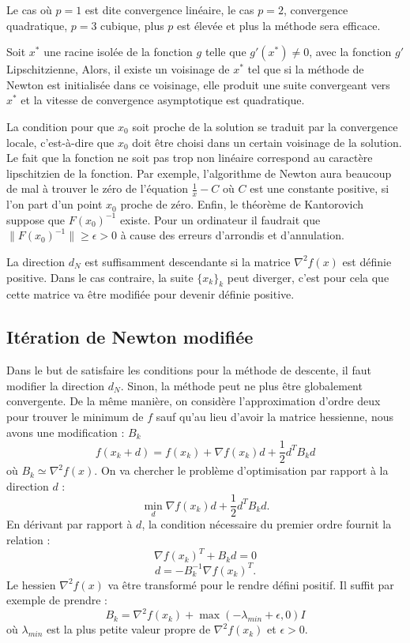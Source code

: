 Le cas o\`u $p=1$ est dite convergence lin\'eaire, le cas $p=2$, convergence quadratique, $p=3$ cubique, plus $p$
est \'elev\'ee et plus la m\'ethode sera efficace.

\begin{frtheoreme}
Soit $x^*$ une racine isol\'ee de la fonction $g$ telle que $g'(x^*)\neq 0$, avec la fonction $g'$ Lipschitzienne, 
 Alors, il existe un voisinage de $x^*$ tel que si la m\'ethode de Newton 
est initialis\'ee dans ce voisinage, elle produit une suite convergeant vers $x^*$ et la vitesse de convergence 
asymptotique est quadratique.
\end{frtheoreme}


La condition pour que $x_0$ soit proche de la solution se traduit par la convergence locale, c'est-\`a-dire que $x_0$ doit
être choisi dans un certain voisinage de la solution.
Le fait que la fonction ne soit pas trop non lin\'eaire correspond au caract\`ere lipschitzien 
de la fonction. Par exemple, l'algorithme de Newton aura beaucoup de mal \`a trouver le z\'ero de l'\'equation
$\frac{1}{x}-C$ o\`u $C$ est une constante positive, si l'on part d'un point $x_0$ proche de z\'ero.
 Enfin, le th\'eor\`eme de Kantorovich suppose que $F(x_0)^{-1}$ existe. Pour un 
ordinateur il faudrait que $\lVert F(x_0)^{-1}\rVert \geq \epsilon>0$ \`a cause des erreurs
d'arrondis et d'annulation.

La direction $d_N$ est suffisamment descendante si la matrice $\nabla^2 f(x)$ est d\'efinie positive. Dans le 
cas contraire, la suite $\{x_k\}_k$ peut diverger, c'est pour cela que cette matrice va être modifi\'ee pour 
devenir d\'efinie positive.

\subsection{It\'eration de Newton modifi\'ee}

Dans le but de satisfaire les conditions pour la m\'ethode de descente, il faut modifier la direction $d_N$.
 Sinon, la m\'ethode peut ne plus être globalement convergente. 
De la même mani\`ere, on consid\`ere l'approximation d'ordre deux pour trouver le minimum de $f$ sauf qu'au lieu
d'avoir la matrice hessienne, nous avons une modification : $B_k$
$$f(x_k+d)=f(x_k)+\nabla f(x_k)d+\frac{1}{2}d^TB_kd$$ 
o\`u $B_k\simeq \nabla^2f(x)$. On va chercher le probl\`eme d'optimisation par rapport \`a la direction $d$ :
$$\min_d\nabla f(x_k)d+\frac{1}{2}d^TB_kd.$$
En d\'erivant par rapport \`a $d$, la condition n\'ecessaire du premier ordre fournit la relation :
$$\nabla f(x_k)^T+B_kd=0$$
$$d=-B_k^{-1}\nabla f(x_k)^T.$$
Le hessien $\nabla^2f(x)$ va être transform\'e pour le rendre d\'efini positif. Il suffit par exemple de prendre :
$$B_k=\nabla^2 f(x_k)+\max(-\lambda_{min}+\epsilon,0)I$$
o\`u $\lambda_{min}$ est la plus petite valeur propre de $\nabla^2 f(x_k)$ et $\epsilon>0$.


